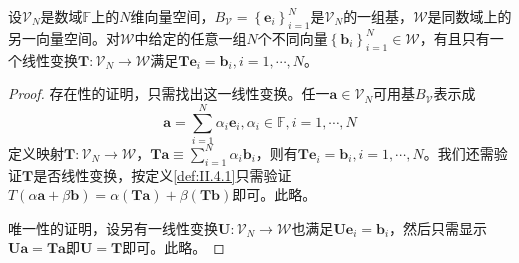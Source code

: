 \documentclass[main.tex]{subfiles}
\begin{document}
\begin{lemma}\label{lem:II.4.1}
设$\mathcal{V}_N$是数域$\mathbb{F}$上的$N$维向量空间，$B_\mathcal{V}=\left\{\mathbf{e}_i\right\}_{i=1}^N$是$\mathcal{V}_N$的一组基，$\mathcal{W}$是同数域上的另一向量空间。对$\mathcal{W}$中给定的任意一组$N$个不同向量$\left\{\mathbf{b}_i\right\}_{i=1}^N\in\mathcal{W}$，有且只有一个线性变换$\mathbf{T}:\mathcal{V}_N\rightarrow\mathcal{W}$满足$\mathbf{Te}_i=\mathbf{b}_i,i=1,\cdots,N$。
\end{lemma}
\begin{proof}
存在性的证明，只需找出这一线性变换。任一$\mathbf{a}\in\mathcal{V}_N$可用基$B_\mathcal{V}$表示成
\[\mathbf{a}=\sum_{i=1}^N\alpha_i\mathbf{e}_i,\alpha_i\in\mathbb{F},i=1,\cdots,N\]
定义映射$\mathbf{T}:\mathcal{V}_N\rightarrow\mathcal{W}，\mathbf{Ta}\equiv\sum_{i=1}^N\alpha_i\mathbf{b}_i$，则有$\mathbf{Te}_i=\mathbf{b}_i,i=1,\cdots,N$。我们还需验证$\mathbf{T}$是否线性变换，按定义\ref{def:II.4.1}只需验证$T\left(\alpha\mathbf{a}+\beta\mathbf{b}\right)=\alpha\left(\mathbf{Ta}\right)+\beta\left(\mathbf{Tb}\right)$即可。此略。

唯一性的证明，设另有一线性变换$\mathbf{U}:\mathcal{V}_N\rightarrow\mathcal{W}$也满足$\mathbf{Ue}_i=\mathbf{b}_i$，然后只需显示$\mathbf{Ua}=\mathbf{Ta}$即$\mathbf{U}=\mathbf{T}$即可。此略。
\end{proof}
\end{document}
